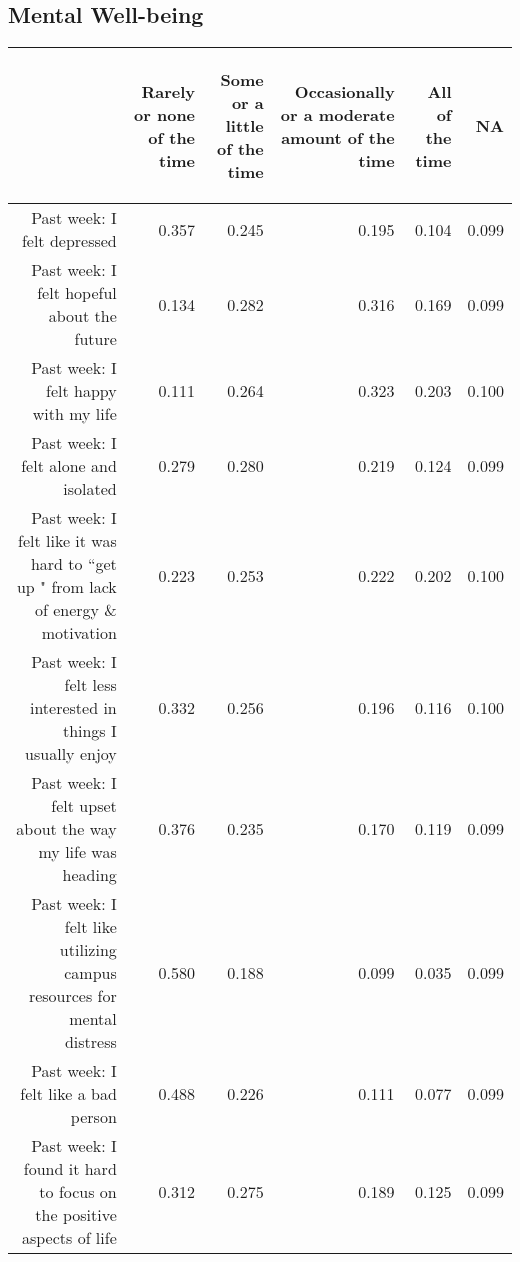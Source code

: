 \documentclass{article}\usepackage[]{graphicx}\usepackage[]{color}
\makeatletter
\newenvironment{kframe}{%
 \def\at@end@of@kframe{}%
 \ifinner\ifhmode%
  \def\at@end@of@kframe{\end{minipage}}%
  \begin{minipage}{\columnwidth}%
 \fi\fi%
 \def\FrameCommand##1{\hskip\@totalleftmargin \hskip-\fboxsep
 \colorbox{shadecolor}{##1}\hskip-\fboxsep
     \hskip-\linewidth \hskip-\@totalleftmargin \hskip\columnwidth}%
 \MakeFramed {\advance\hsize-\width
   \@totalleftmargin\z@ \linewidth\hsize
   \@setminipage}}%
 {\par\unskip\endMakeFramed%
 \at@end@of@kframe}
\makeatother
\begin{document}
\subsection{Mental Well-being}
\begin{table}[ht]
\centering
\begin{tabular}{rrrrrr}
  \hline
 & \begin{sideways} Rarely or none of the time \end{sideways} & \begin{sideways} Some or a little of the time \end{sideways} & \begin{sideways} Occasionally or a moderate amount of the time \end{sideways} & \begin{sideways} All of the time \end{sideways} & \begin{sideways} NA \end{sideways} \\ 
  \hline
Past week: I felt depressed & 0.357 & 0.245 & 0.195 & 0.104 & 0.099 \\ 
  Past week: I felt hopeful about the future & 0.134 & 0.282 & 0.316 & 0.169 & 0.099 \\ 
  Past week: I felt happy with my life & 0.111 & 0.264 & 0.323 & 0.203 & 0.100 \\ 
  Past week: I felt alone and isolated & 0.279 & 0.280 & 0.219 & 0.124 & 0.099 \\ 
  Past week: I felt like it was hard to ``get up " from lack of energy \& motivation & 0.223 & 0.253 & 0.222 & 0.202 & 0.100 \\ 
  	Past week: I felt less interested in things I usually enjoy & 0.332 & 0.256 & 0.196 & 0.116 & 0.100 \\ 
  	Past week: I felt upset about the way my life was heading & 0.376 & 0.235 & 0.170 & 0.119 & 0.099 \\ 
  Past week: I felt like utilizing campus resources for mental distress & 0.580 & 0.188 & 0.099 & 0.035 & 0.099 \\ 
  Past week: I felt like a bad person & 0.488 & 0.226 & 0.111 & 0.077 & 0.099 \\ 
  Past week: I found it hard to focus on the positive aspects of life & 0.312 & 0.275 & 0.189 & 0.125 & 0.099 \\ 
   \hline
\end{tabular}
\end{table}
\begin{kframe}

{\ttfamily\noindent\bfseries{}}\end{kframe}
\end{document}
